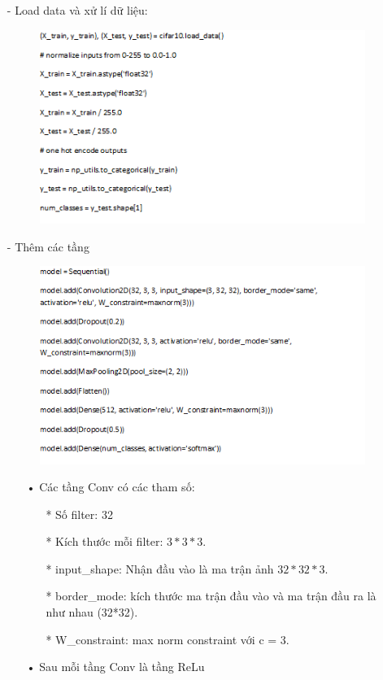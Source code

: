 \documentclass[a4paper,12pt]{report}
\begin{document}
\begin{itemize}
\item[-] Load data và xử lí dữ liệu:
\begin{figure}[h]
\begin{center}
\includegraphics[width =0.7 \textwidth]{code1.png}
\end{center}
\end{figure}
\item[-] Thêm các tầng
\begin{figure}[h]
\begin{center}
\includegraphics[width =0.7 \textwidth]{code2.png}
\end{center}
\end{figure}
\begin{itemize}
\item[•] Các tầng Conv có các tham số:
\begin{itemize}
\item[*] Số filter: 32
\item[*] Kích thước mỗi filter: $3*3*3$.
\item[*] input\_shape: Nhận đầu vào là ma trận ảnh $32*32*3$.
\item[*] border\_mode: kích thước ma trận đầu vào và ma trận đầu ra là như nhau (32*32).
\item[*] W\_constraint: max norm constraint với c = 3.
\end{itemize}
\item[•] Sau mỗi tầng Conv là tầng ReLu

\end{itemize}
\end{itemize}
\end{document}

